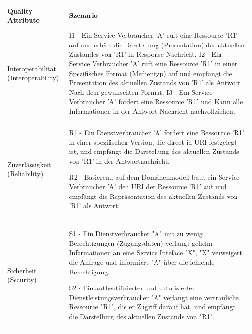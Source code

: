 \documentclass{acmsiggraph}
\begin{document}
\begin{center}
  \label{tab:xtab}
  \begin{xtabular}{|C{2cm}|L{6cm}|} 
  \hline
    Quality Attribute & Szenario \\
    \hline
    & \\[-2ex]
    Interoperabilität (Interoperability) & I1 - Ein  Service Verbraucher 'A' ruft eine Ressource 'R1' auf und
erhält die Darstellung (Presentation) des aktuellen Zustandes von 'R1' in Response-Nachricht.
I2 - Ein Service Verbraucher 'A' ruft eine Ressource 'R1' in einer
Spezifisches Format (Medientyp) auf und empfängt die
Presentation des aktuellen Zustands von 'R1' als Antwort
Nach dem gewünschten Format.
I3 - Ein Service Verbraucher 'A' fordert eine Ressource 'R1' und
Kann alle Informationen in der Antwort Nachricht nachvollziehen.
 \\ 
       \hline
       & \\[-2ex]
    Zuverlässigkeit (Reliability) & R1 - Ein Dienstverbraucher 'A' fordert eine Ressource 'R1' in einer spezifischen Version, die direct  in URI festgelegt ist, und empfängt die Darstellung des aktuellen Zustands von 'R1' in der Antwortnachricht.

R2 - Basierend auf dem Domänenmodell baut ein Service-Verbraucher 'A' den URI der Ressource 'R1' auf und empfängt die Repräsentation des aktuellen Zustands von 'R1' als Antwort.
 \\ 
      \hline
      & \\[-2ex]
     Sicherheit  (Security) & 
     S1 - Ein Dienstverbraucher "A" mit zu wenig Berechtigungen (Zugangsdaten) verlangt geheim Informationen an eine Service Inteface "X", "X" verweigert die Anfrage und informiert "A" über die fehlende Berechtigung.

S2 - Ein authentifizierter und autorisierter Dienstleistungsverbraucher "A" verlangt eine vertrauliche Ressource "R1", die er Zugriff darauf hat, und empfängt die Darstellung des aktuellen Zustands von "R1".


\end{xtabular}
\end{center}
\end{document}
